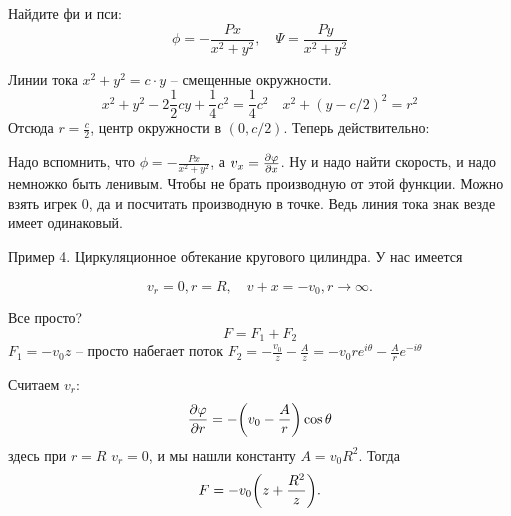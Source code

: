 Найдите фи и пси:
\begin{equation}
	\phi=-\frac{Px}{x^2+y^2}, \quad
	\Psi=\frac{Py}{x^2+y^2}
\end{equation}

Линии тока $x^2+y^2=c\cdot y$ -- смещенные окружности.
\begin{equation}
	x^2+y^2-2\frac{1}{2}cy+\frac{1}{4}c^2=\frac{1}{4}c^2 \quad
	x^2+(y-c/2)^2=r^2
\end{equation}
Отсюда $r=\frac{c}{2}$, центр окружности в $(0,c/2)$. Теперь действительно:
\begin{comment}
		   _<_
		  /	  \
		 /	   \
		 \	   /
		  \	o /
------------*----------------->
		 	o
		  /	  \
		 /	   \
		 \	   /
		  \_<_/
\end{comment}

Надо вспомнить, что $\phi=-\frac{Px}{x^2+y^2}$, а $v_x=\pdv{\varphi}{x}$. Ну и надо найти скорость, и надо немножко быть ленивым. Чтобы не брать производную от этой функции. Можно взять игрек 0, да и посчитать производную в точке. Ведь линия тока знак везде имеет одинаковый.

Пример 4. Циркуляционное обтекание кругового цилиндра. У нас имеется 
\begin{comment}
   ______
  /	     /\
 /	   R/  \
/	   /    \
*     *     |  <----------поток набегает на 
\           /
 \         /
  \_______/
\end{comment}
\begin{equation}
	v_r=0, r=R, \quad
	v+x=-v_0, r\to\infty.
\end{equation}

Все просто?
\begin{equation}
	F=F_1+F_2
\end{equation}
$F_1=-v_0z$ -- просто набегает поток
$F_2=-\frac{v_0}{z}-\frac{A}{z}=-v_0r e^{i\theta} -\frac{A}{r} e^{-i\theta}$

Считаем $v_r$:
\begin{equation}
	\pdv{\varphi}{r}=-\qty(v_0-\frac{A}{r})\cos\theta
\end{equation}
здесь при $r=R$ $v_r=0$, и мы нашли константу $A=v_0R^2$.
Тогда
\begin{equation}
	F=-v_0\qty(z+\frac{R^2}{z}).
\end{equation}

\begin{comment}
	   <--\
           \
   ______   \
  /	     /\  \
 /	   R/  \  \
/	   /    \  \_____
*     *     |  <----------поток набегает на 
\           /
 \         /
  \_______/
\end{comment}

